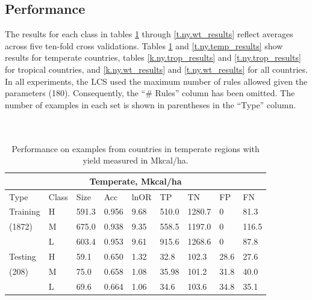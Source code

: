 \documentclass[12pt,twoside]{article}
\begin{document}
\subsection{Performance}
The results for each class in tables \ref{k.ny.temp_results} through \ref{t.ny.wt_results} reflect averages across five ten-fold cross validations. Tables \ref{k.ny.temp_results} and \ref{t.ny.temp_results} show results for temperate countries, tables \ref{k.ny.trop_results} and \ref{t.ny.trop_results} for tropical countries, and \ref{k.ny.wt_results} and \ref{t.ny.wt_results} for all countries. In all experiments, the LCS used the maximum number of rules allowed given the parameters (180). Consequently, the ``\# Rules'' column has been omitted. The number of examples in each set is shown in parentheses in the ``Type'' column.
\\
\\
\\
\begin{table}[h!]
\centering
\begin{tabular}{lllllllll}
\toprule
\multicolumn{9}{c}{\textbf{Temperate, Mkcal/ha}} \\
\midrule
Type & Class & Size & Acc & lnOR & TP & TN & FP & FN \\
\midrule
Training & H & 591.3 & 0.956 & 9.68 & 510.0 & 1280.7 & 0 & 81.3  \\
(1872) & M & 675.0 & 0.938 & 9.35 & 558.5 & 1197.0 & 0 & 116.5  \\
& L & 603.4 & 0.953 & 9.61 & 915.6 & 1268.6 & 0 & 87.8  \\
Testing & H & 59.1 & 0.650 & 1.32 & 32.8 & 102.3 & 28.6 & 27.6  \\
(208) & M & 75.0 & 0.658 & 1.08 & 35.98 & 101.2 & 31.8 & 40.0  \\
& L & 69.6 & 0.664 & 1.06 & 34.6 & 103.6 & 34.8 & 35.1  \\
\bottomrule
\end{tabular}
\captionsetup{width=.85\textwidth}
\caption[Performance on Temperate Data with Yield in Mkcal/ha]{Performance on examples from countries in temperate regions with yield measured in Mkcal/ha.}
\label{k.ny.temp_results}
\end{table}
\end{document}
